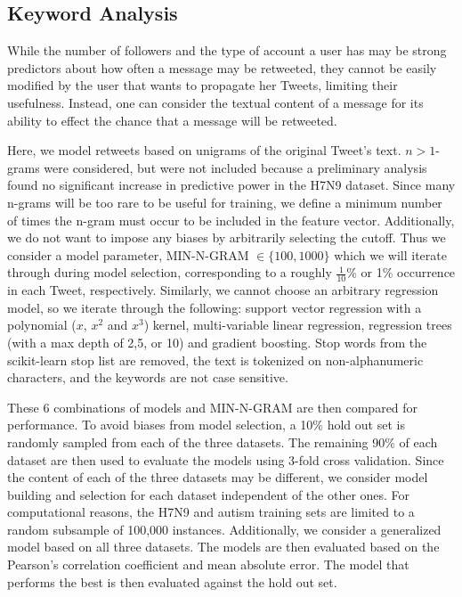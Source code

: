 \subsection{Keyword Analysis}
While the number of followers and the type of account a user has may be strong predictors about how often a message may be retweeted, they cannot be easily modified by the user that wants to propagate her Tweets, limiting their usefulness. Instead, one can consider the textual content of a message for its ability to effect the chance that a message will be retweeted. 

Here, we model retweets based on unigrams of the original Tweet's text. \(n > 1\)-grams were considered, but were not included because a preliminary analysis found no significant increase in predictive power in the H7N9 dataset.  Since many n-grams will be too rare to be useful for training, we define a minimum number of times the n-gram must occur to be included in the feature vector. Additionally, we do not want to impose any biases by arbitrarily selecting the cutoff. Thus we consider a model parameter, MIN-N-GRAM \(\in\{ 100,1000\}\) which we will iterate through during model selection, corresponding to a roughly \(\frac{1}{10}\)\% or 1\% occurrence in each Tweet, respectively. Similarly, we cannot choose an arbitrary regression model, so we iterate through the following: support vector regression with a polynomial (\(x\), \(x^2\) and \(x^3\)) kernel, multi-variable linear regression, regression trees (with a max depth of 2,5, or 10) and gradient boosting. Stop words from the scikit-learn  stop list\cite{scikit-learn} are removed, the text is tokenized on non-alphanumeric characters, and the keywords are not case sensitive.

These 6 combinations of models and MIN-N-GRAM are then compared for performance. To avoid biases from model selection, a 10\% hold out set is randomly sampled from each of the three datasets. The remaining 90\% of each dataset are then used to evaluate the models using 3-fold cross validation. Since the content of each of the three datasets may be different, we consider model building and selection for each dataset independent of the other ones. For computational reasons, the H7N9 and autism training sets are limited to a random subsample of 100,000 instances.  Additionally, we consider a generalized model based on all three datasets. The models are then evaluated based on the Pearson's correlation coefficient and mean absolute error. The model that performs the best is then evaluated against the hold out set.

